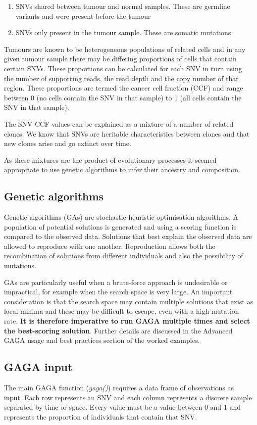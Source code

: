 \documentclass{article}
\begin{document}
\begin{enumerate}
   \item SNVs shared between tumour and normal samples.  These are germline variants and were present before the tumour
   \item SNVs only present in the tumour sample.  These are somatic mutations
\end{enumerate}

Tumours are known to be heterogeneous populations of related cells and in any given tumour sample there may be differing proportions of cells that contain certain SNVs.  These proportions can be calculated for each SNV in turn using the number of supporting reads, the read depth and the copy number of that region.  These proportions are termed the cancer cell fraction (CCF) and range between 0 (no cells contain the SNV in that sample) to 1 (all cells contain the SNV in that sample).

The SNV CCF values can be explained as a mixture of a number of related clones.  We know that SNVs are heritable characteristics between clones and that new clones arise and go extinct over time.

As these mixtures are the product of evolutionary processes it seemed appropriate to use genetic algorithms to infer their ancestry and composition.

\subsection{Genetic algorithms}
Genetic algorithms (GAs) are stochastic heuristic optimisation algorithms.  A population of potential solutions is generated and using a scoring function is compared to the observed data.  Solutions that best explain the observed data are allowed to reproduce with one another.  Reproduction allows both the recombination of solutions from different individuals and also the possibility of mutations.

GAs are particularly useful when a brute-force approach is undesirable or impractical, for example when the search space is very large.  An important consideration is that the search space may contain multiple solutions that exist as local minima and these may be difficult to escape, even with a high mutation rate.  \textbf{It is therefore imperative to run GAGA multiple times and select the best-scoring solution}.  Further details are discussed in the Advanced GAGA usage and best practices section of the worked examples.

\subsection{GAGA input}
The main GAGA function (\emph{gaga()}) requires a data frame of observations as input.  Each row represents an SNV and each column represents a discrete sample separated by time or space. Every value must be a value between 0 and 1 and represents the proportion of individuals that contain that SNV.
\end{document}

